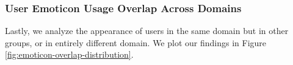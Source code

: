 
\subsubsection{User Emoticon Usage Overlap Across Domains}
Lastly, we analyze the appearance of users in the same domain but in other groups, or in entirely different domain. We plot our findings in Figure \ref{fig:emoticon-overlap-distribution}.

